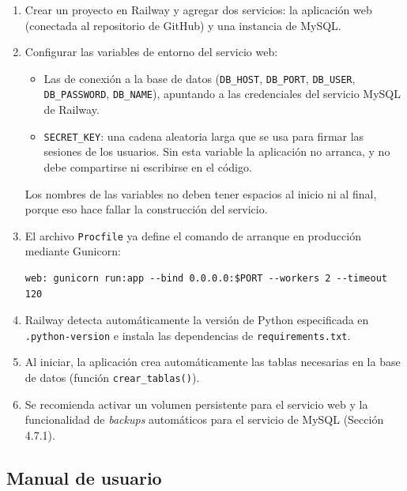 \begin{enumerate}
    \item Crear un proyecto en Railway y agregar dos servicios: la aplicación web (conectada al repositorio de GitHub) y una instancia de MySQL.
    \item Configurar las variables de entorno del servicio web:
    \begin{itemize}
        \item Las de conexión a la base de datos (\texttt{DB\_HOST}, \texttt{DB\_PORT}, \texttt{DB\_USER}, \texttt{DB\_PASSWORD}, \texttt{DB\_NAME}), apuntando a las credenciales del servicio MySQL de Railway.
        \item \texttt{SECRET\_KEY}: una cadena aleatoria larga que se usa para firmar las sesiones de los usuarios. Sin esta variable la aplicación no arranca, y no debe compartirse ni escribirse en el código.
    \end{itemize}
    Los nombres de las variables no deben tener espacios al inicio ni al final, porque eso hace fallar la construcción del servicio.
    \item El archivo \texttt{Procfile} ya define el comando de arranque en producción mediante Gunicorn:
    \begin{verbatim}
web: gunicorn run:app --bind 0.0.0.0:$PORT --workers 2 --timeout 120
    \end{verbatim}
    \item Railway detecta automáticamente la versión de Python especificada en \texttt{.python-version} e instala las dependencias de \texttt{requirements.txt}.
    \item Al iniciar, la aplicación crea automáticamente las tablas necesarias en la base de datos (función \texttt{crear\_tablas()}).
    \item Se recomienda activar un volumen persistente para el servicio web y la funcionalidad de \textit{backups} automáticos para el servicio de MySQL (Sección 4.7.1).
\end{enumerate}

\subsection*{Manual de usuario}

